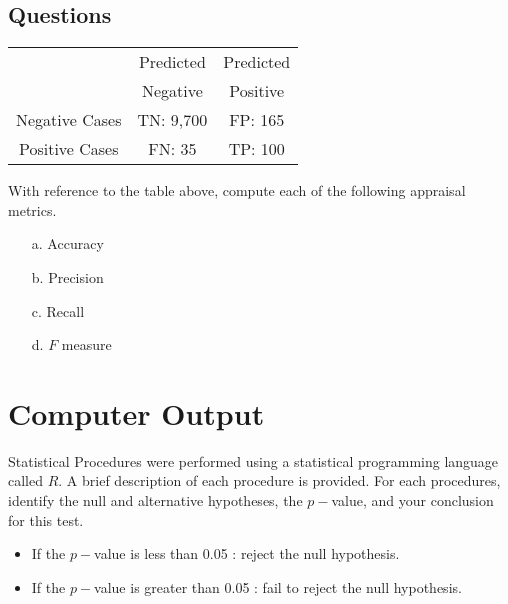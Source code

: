 \documentclass[]{article}
\begin{document}
\subsection*{Questions}
\begin{center}
\begin{tabular}{|c|c|c|}
\hline
& Predicted  & Predicted \\
 & Negative & Positive \\ \hline
Negative Cases & TN: 9,700  & FP: 165 \\ \hline
Positive Cases & FN: 35 & TP: 100 \\ \hline
\end{tabular} 
\end{center}
\newpage
With reference to the table above, compute each of the following appraisal metrics.
\begin{multicols}{2} 
\begin{itemize}
    \item[a.] Accuracy
    \item[b.] Precision
    \item[c.] Recall
    \item[d.] $F$ measure
    \end{itemize}
\end{multicols}

\section{Computer Output}
Statistical Procedures were performed using a statistical programming language called $R$.
A brief description of each procedure is provided. For each procedures, identify the null and alternative hypotheses, the $p-$value, and your conclusion for this test.


\begin{itemize}
\item If the $p-$value is less than 0.05 : reject the null hypothesis.
\item If the $p-$value is greater than 0.05 : fail to reject the null hypothesis.
\end{itemize}
\end{document}
